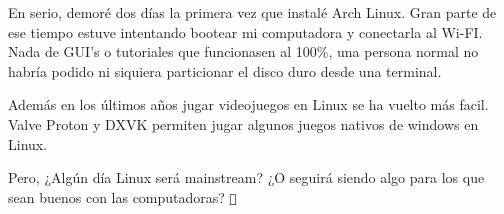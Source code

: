 \documentclass[12pt, twoside]{article}
\newcommand{\btw}{{\color{arch}\texttt{}} }
\begin{document}
En serio, demoré dos días la primera vez que instalé Arch Linux.
Gran parte de ese tiempo estuve intentando bootear mi computadora y conectarla al Wi-FI.
Nada de GUI's o tutoriales que funcionasen al 100\%, una persona normal no habría podido ni siquiera
particionar el disco duro desde una terminal.

Además en los últimos años jugar videojuegos en Linux se ha vuelto más facil.
Valve Proton y DXVK permiten jugar algunos juegos nativos de windows en Linux.

Pero, ¿Algún día Linux será mainstream?
¿O seguirá siendo algo para los que sean buenos con las computadoras?
\btw
\newpage
\printbibliography[heading=bibintoc, title={Lista de referencias}]
\end{document}
